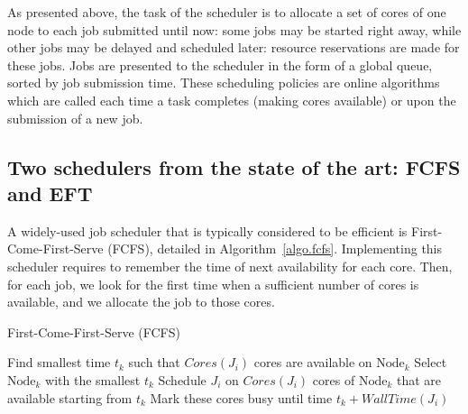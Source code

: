 \documentclass[sigconf,review,anonymous]{acmart}
\newcommand{\Node}[1]{\ensuremath{\mathrm{Node}_{#1}}\xspace}
\newcommand{\core}{\mathit{Cores}\xspace}
\newcommand{\walltime}{\mathit{WallTime}\xspace}
\newcommand{\nodeset}{\ensuremath{\mathbb{N}}\xspace}
\begin{document}
As presented above, the task of the scheduler is to allocate a set of
cores of one node
to each job submitted until now: some jobs may be started right away,
while other jobs may be delayed and scheduled later: resource
reservations are made for these jobs. Jobs are presented to the
scheduler in the form of a global queue, sorted by job submission
time. These scheduling policies are online algorithms which are called each time
a task completes (making cores available) or upon the submission of
a new job.





\subsection{Two schedulers from the state of the art: FCFS and EFT}\label{subsec.fcfs_eft}

A widely-used job scheduler that is typically considered to be efficient is
First-Come-First-Serve (FCFS), detailed in
Algorithm~\ref{algo.fcfs}. Implementing this scheduler requires to
remember the time of next availability for each core. Then, for each job, we look
for the first time when a sufficient number of cores is available, and we allocate the job to
those cores.


\begin{algorithm}[htbp]%
\caption{First-Come-First-Serve (FCFS)}\label{algo.fcfs}
\begin{algorithmic}[1]
        \ForEach{$\Node{k} \in \nodeset$}
        \State Find smallest time $t_k$ such that $\core(J_i)$ cores are available on \Node{k}\label{fcfs.ln.find}
        \EndFor
        \State Select \Node{k}  with the smallest $t_k$
        \State Schedule $J_i$ on $\core(J_i)$ cores of \Node{k} that are available starting from $t_k$
        \State Mark these cores busy until time $t_k +\walltime(J_i)$
	\EndFor
	\end{algorithmic}
\end{algorithm}
\end{document}
